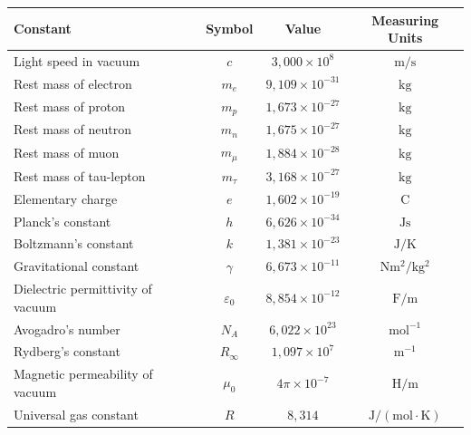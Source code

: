 \begin{minipage}{\textwidth}
	\begin{tcolorbox}[title=\textbf{Useful Physical Constants}]
		\vspace{-5pt}
		\begin{center}
			\begin{tabular}{|l|c|c|c|}
				\hline
				\textbf{Constant} & \textbf{Symbol} & \textbf{Value} & \textbf{Measuring Units} 
				\\
				\hline
				Light speed in vacuum & $c$ & $3{,}000 \times 10^8$ & $\mathrm{m/s}$
				\rule{0pt}{10pt}
				\\[1pt]
				\hline
				Rest mass of electron & $m_e$ & $9{,}109 \times 10^{-31}$ & $\mathrm{kg}$
				\rule{0pt}{10pt}
				\\[1pt]
				\hline
				Rest mass of proton & $m_p$ & $1{,}673 \times 10^{-27}$ & $\mathrm{kg}$
				\rule{0pt}{10pt}
				\\[1pt]
				\hline
				Rest mass of neutron & $m_n$ & $1{,}675 \times 10^{-27}$ & $\mathrm{kg}$
				\rule{0pt}{10pt}
				\\[1pt]
				\hline
				Rest mass of muon & $m_{\mu}$ & $1{,}884 \times 10^{-28}$ & $\mathrm{kg}$
				\rule{0pt}{10pt}
				\\[1pt]
				\hline
				Rest mass of tau-lepton & $m_{\tau}$ & $3{,}168 \times 10^{-27}$ & $\mathrm{kg}$
				\rule{0pt}{10pt}
				\\[1pt]
				\hline
				Elementary charge & $e$ & $1{,}602 \times 10^{-19}$ & $\mathrm{C}$
				\rule{0pt}{10pt}
				\\[1pt]
				\hline
				Planck's constant & $h$ & $6{,}626 \times 10^{-34}$ & $\mathrm{Js}$
				\rule{0pt}{10pt}
				\\[1pt]
				\hline
				Boltzmann's constant & $k$ & $1{,}381 \times 10^{-23}$ & $\mathrm{J/K}$
				\rule{0pt}{10pt}
				\\[1pt]
				\hline
				Gravitational constant & $\gamma$ & $6{,}673 \times 10^{-11}$ & $\mathrm{Nm^2/kg^2}$ 
				\rule{0pt}{10pt}
				\\[1pt]
				\hline
				Dielectric permittivity of vacuum & $\varepsilon_0$ & $8{,}854 \times 10^{-12}$ & $\mathrm{F/m}$
				\rule{0pt}{10pt}
				\\[1pt]
				\hline
				Avogadro's number & $N_A$ & $6{,}022 \times 10^{23}$ & $\mathrm{mol^{-1}}$
				\rule{0pt}{10pt}
				\\[1pt]
				\hline
				Rydberg's constant & $R_{\infty}$ & $1{,}097 \times 10^7$ & $\mathrm{m^{-1}}$
				\rule{0pt}{10pt}
				\\[1pt]
				\hline
				Magnetic permeability of vacuum & $\mu_0$ & $4\pi \times 10^{-7}$ & $\mathrm{H/m}$
				\rule{0pt}{10pt}
				\\[1pt]
				\hline
				Universal gas constant & $R$ & $8{,}314$ & $\mathrm{J / (mol \cdot K)}$
				\rule{0pt}{10pt}
				\\[1pt]
				\hline
			\end{tabular}
		\end{center}
	\end{tcolorbox}
\end{minipage}